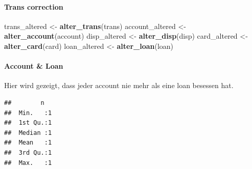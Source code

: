 \documentclass[]{article}
\newenvironment{Shaded}{\begin{snugshade}}{\end{snugshade}}
\newcommand{\ControlFlowTok}[1]{\textcolor[rgb]{0.13,0.29,0.53}{\textbf{#1}}}
\newcommand{\DataTypeTok}[1]{\textcolor[rgb]{0.13,0.29,0.53}{#1}}
\newcommand{\KeywordTok}[1]{\textcolor[rgb]{0.13,0.29,0.53}{\textbf{#1}}}
\newcommand{\NormalTok}[1]{#1}
\newcommand{\OperatorTok}[1]{\textcolor[rgb]{0.81,0.36,0.00}{\textbf{#1}}}
\newcommand{\StringTok}[1]{\textcolor[rgb]{0.31,0.60,0.02}{#1}}
\let\oldparagraph\paragraph
\renewcommand{\paragraph}[1]{\oldparagraph{#1}\mbox{}}
\begin{document}
\hypertarget{trans-correction}{%
\paragraph{Trans correction}\label{trans-correction}}

\begin{Shaded}
\begin{Highlighting}[]
\NormalTok{trans_altered <-}\StringTok{ }\KeywordTok{alter_trans}\NormalTok{(trans)}
\NormalTok{account_altered <-}\StringTok{ }\KeywordTok{alter_account}\NormalTok{(account)}
\NormalTok{disp_altered <-}\StringTok{ }\KeywordTok{alter_disp}\NormalTok{(disp)}
\NormalTok{card_altered <-}\StringTok{ }\KeywordTok{alter_card}\NormalTok{(card)}
\NormalTok{loan_altered <-}\StringTok{ }\KeywordTok{alter_loan}\NormalTok{(loan)}
\end{Highlighting}
\end{Shaded}

\hypertarget{account-loan}{%
\paragraph{Account \& Loan}\label{account-loan}}

Hier wird gezeigt, dass jeder account nie mehr als eine loan besessen
hat.

\begin{Shaded}
\end{Shaded}

\begin{verbatim}
##        n    
##  Min.   :1  
##  1st Qu.:1  
##  Median :1  
##  Mean   :1  
##  3rd Qu.:1  
##  Max.   :1
\end{verbatim}
\end{document}
